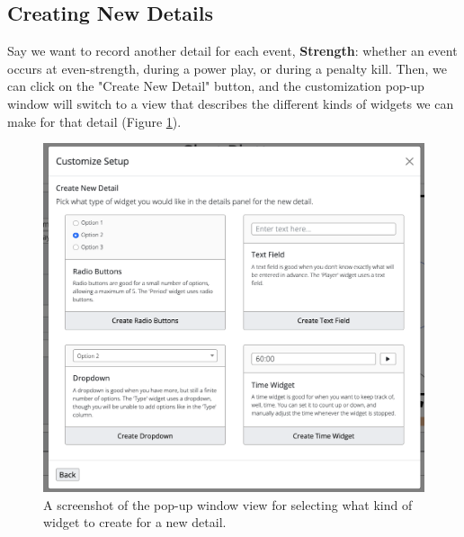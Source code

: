 \documentclass[letterpaper]{article}
\begin{document}
\subsection{Creating New Details}\label{create-column}
Say we want to record another detail for each event, \textbf{Strength}: whether an event occurs at even-strength, during a power play, or during a penalty kill. Then, we can click on the "Create New Detail" button, and the customization pop-up window will switch to a view that describes the different kinds of widgets we can make for that detail (Figure \ref{fig:widget-select}).

\begin{figure}[h!]
			\centering
		\includegraphics[width=.9\linewidth]{images/widget-select}
	\caption{A screenshot of the pop-up window view for selecting what kind of widget to create for a new detail.}
	\label{fig:widget-select}
	\end{figure}
\end{document}
